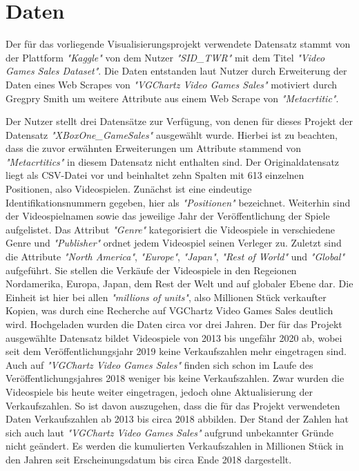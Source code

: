 \documentclass[usegeometry=true]{scrartcl}
\begin{document}
\section{Daten}
Der für das vorliegende Visualisierungsprojekt verwendete Datensatz stammt von der Plattform \textit{"Kaggle"} von dem Nutzer \textit{"SID_TWR"} mit dem Titel \textit{"Video Games Sales Dataset"}. Die Daten entstanden laut Nutzer durch Erweiterung der Daten eines Web Scrapes von \textit{"VGChartz Video Games Sales"} motiviert durch Gregpry Smith um weitere Attribute aus einem Web Scrape von \textit{"Metacrtitic"}.  %

Der Nutzer stellt drei Datensätze zur Verfügung, von denen für dieses Projekt der Datensatz \textit{"XBoxOne_GameSales"} ausgewählt wurde. Hierbei ist zu beachten, dass die zuvor erwähnten Erweiterungen um Attribute stammend von \textit{"Metacrtitics"} in diesem Datensatz nicht enthalten sind. 
Der Originaldatensatz liegt als CSV-Datei vor und beinhaltet zehn Spalten mit 613 einzelnen Positionen, also Videospielen. 
Zunächst ist eine eindeutige Identifikationsnummern gegeben, hier als \textit{"Positionen"} bezeichnet. Weiterhin sind der Videospielnamen sowie das jeweilige Jahr der Veröffentlichung der Spiele aufgelistet. 
Das Attribut \textit{"Genre"} kategorisiert die Videospiele in verschiedene Genre und \textit{"Publisher"} ordnet jedem Videospiel seinen Verleger zu. 
Zuletzt sind die Attribute \textit{"North America"}, \textit{"Europe"}, \textit{"Japan"}, \textit{"Rest of World"} und \textit{"Global"} aufgeführt. Sie stellen die Verkäufe der Videospiele in den Regeionen Nordamerika, Europa, Japan, dem Rest der Welt und auf globaler Ebene dar. 
Die Einheit ist hier bei allen \textit{"millions of units"}, also Millionen Stück verkaufter Kopien, was durch eine Recherche auf VGChartz Video Games Sales deutlich wird. %
Hochgeladen wurden die Daten circa vor drei Jahren. Der für das Projekt ausgewählte Datensatz bildet Videospiele von 2013 bis ungefähr 2020 ab, wobei seit dem Veröffentlichungsjahr 2019 keine Verkaufszahlen mehr eingetragen sind. 
Auch auf \textit{"VGChartz Video Games Sales"} finden sich schon im Laufe des Veröffentlichungsjahres 2018 weniger bis keine Verkaufszahlen. Zwar wurden die Videospiele bis heute weiter eingetragen, jedoch ohne Aktualisierung der Verkaufszahlen. 
So ist davon auszugehen, dass die für das Projekt verwendeten Daten Verkaufszahlen ab 2013 bis circa 2018 abbilden. Der Stand der Zahlen hat sich auch laut \textit{"VGChartz Video Games Sales"} aufgrund unbekannter Gründe nicht geändert. 
Es werden die kumulierten Verkaufszahlen in Millionen Stück in den Jahren seit Erscheinungsdatum bis circa Ende 2018 dargestellt. 
\end{document}
